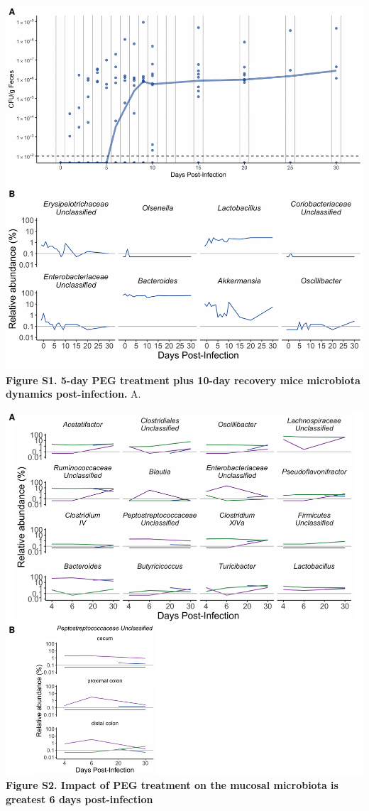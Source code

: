 \documentclass[
  11pt,
]{article}
\begin{document}
\includegraphics{figure_S1.pdf} \textbf{Figure S1. 5-day PEG treatment
plus 10-day recovery mice microbiota dynamics post-infection.} A.
\newpage

\includegraphics{figure_S2.pdf} \textbf{Figure S2. Impact of PEG
treatment on the mucosal microbiota is greatest 6 days post-infection}\\
\newpage
\end{document}
